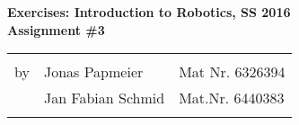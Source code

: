 \documentclass[11pt]{article}
\begin{document}
	
	\begin{center}
		\textbf{
			Exercises: Introduction to Robotics, SS 2016\\
			Assignment \#3\\
		}
		
		\begin{tabular}{lll}
			& \\
			by & Jonas Papmeier & Mat Nr. 6326394\\
			& Jan Fabian Schmid & Mat.Nr. 6440383\\
			\\
			\hline
		\end{tabular}
	\end{center}
	
	
	
	
	
	
	
	
	
\end{document}
